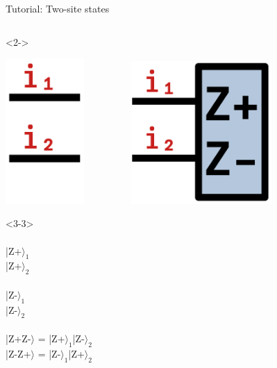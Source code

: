 \begin{frame}[fragile]{Tutorial: Two-site states}
\begin{columns}
\begin{column}{5cm}
\begin{onlyenv}<2->
\vspace*{-0.2cm}
\begin{center}
\includegraphics[width=0.225\textwidth]{
  slides/assets/i1i2.png
} \ \ \ \ \ \ \ \ \
\includegraphics[width=0.4\textwidth]{
  slides/assets/ZpZm12.png
}
\end{center}
\vspace*{0.0cm}
\end{onlyenv}

\begin{onlyenv}<3-3>
~\\
~\\
|Z+$\rangle_1$ \\
|Z+$\rangle_2$ \\
~\\
|Z-$\rangle_1$ \\
|Z-$\rangle_2$ \\
~\\
|Z+Z-$\rangle$ = |Z+$\rangle_1$|Z-$\rangle_2$ \\
|Z-Z+$\rangle$ = |Z-$\rangle_1$|Z+$\rangle_2$
\end{onlyenv}


\end{column}
\end{columns}
\end{frame}
